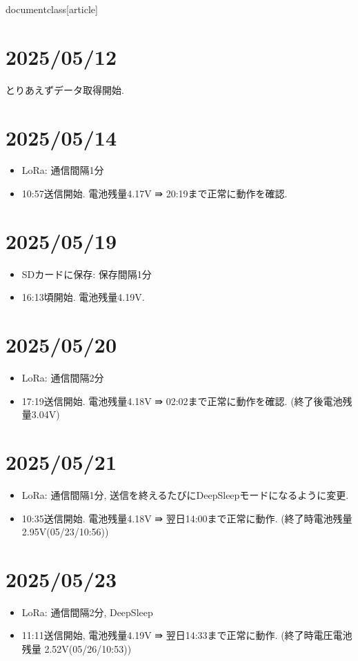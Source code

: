 documentclass[article]



\section{2025/05/12}
とりあえずデータ取得開始.


\section{2025/05/14}
\begin{itemize}
    \item LoRa: 通信間隔1分
    \item 10:57送信開始. 電池残量4.17V ⇛ 20:19まで正常に動作を確認.
\end{itemize}

\section{2025/05/19}
\begin{itemize}
    \item SDカードに保存: 保存間隔1分
    \item 16:13頃開始. 電池残量4.19V.
\end{itemize}

\section{2025/05/20}
\begin{itemize}
    \item LoRa: 通信間隔2分
    \item 17:19送信開始. 電池残量4.18V ⇛ 02:02まで正常に動作を確認. (終了後電池残量3.04V)
\end{itemize}

\section{2025/05/21}
\begin{itemize}
    \item LoRa: 通信間隔1分, 送信を終えるたびにDeepSleepモードになるように変更.
    \item 10:35送信開始. 電池残量4.18V ⇛ 翌日14:00まで正常に動作. (終了時電池残量2.95V(05/23/10:56))
\end{itemize}

\section{2025/05/23}
\begin{itemize}
    \item LoRa: 通信間隔2分, DeepSleep
    \item 11:11送信開始, 電池残量4.19V ⇛ 翌日14:33まで正常に動作.  (終了時電圧電池残量 2.52V(05/26/10:53))
\end{itemize}

